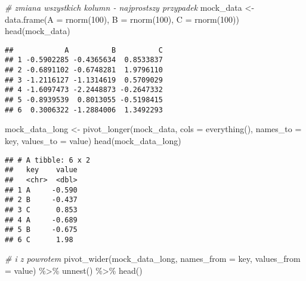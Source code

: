\documentclass[
]{book}
\newenvironment{Shaded}{\begin{snugshade}}{\end{snugshade}}
\newcommand{\AttributeTok}[1]{\textcolor[rgb]{0.77,0.63,0.00}{#1}}
\newcommand{\CommentTok}[1]{\textcolor[rgb]{0.56,0.35,0.01}{\textit{#1}}}
\newcommand{\DecValTok}[1]{\textcolor[rgb]{0.00,0.00,0.81}{#1}}
\newcommand{\FunctionTok}[1]{\textcolor[rgb]{0.00,0.00,0.00}{#1}}
\newcommand{\NormalTok}[1]{#1}
\newcommand{\OtherTok}[1]{\textcolor[rgb]{0.56,0.35,0.01}{#1}}
\newcommand{\SpecialCharTok}[1]{\textcolor[rgb]{0.00,0.00,0.00}{#1}}
\newcommand{\StringTok}[1]{\textcolor[rgb]{0.31,0.60,0.02}{#1}}
\begin{document}
\begin{Shaded}
\begin{Highlighting}[]
\CommentTok{\# zmiana wszystkich kolumn {-} najprostszy przypadek}
\NormalTok{mock\_data }\OtherTok{\textless{}{-}} \FunctionTok{data.frame}\NormalTok{(}\AttributeTok{A =} \FunctionTok{rnorm}\NormalTok{(}\DecValTok{100}\NormalTok{), }\AttributeTok{B =} \FunctionTok{rnorm}\NormalTok{(}\DecValTok{100}\NormalTok{), }\AttributeTok{C =} \FunctionTok{rnorm}\NormalTok{(}\DecValTok{100}\NormalTok{))}
\FunctionTok{head}\NormalTok{(mock\_data)}
\end{Highlighting}
\end{Shaded}

\begin{verbatim}
##            A          B          C
## 1 -0.5902285 -0.4365634  0.8533837
## 2 -0.6891102 -0.6748281  1.9796110
## 3 -1.2116127 -1.1314619  0.5709029
## 4 -1.6097473 -2.2448873 -0.2647332
## 5 -0.8939539  0.8013055 -0.5198415
## 6  0.3006322 -1.2884006  1.3492293
\end{verbatim}

\begin{Shaded}
\begin{Highlighting}[]
\NormalTok{mock\_data\_long }\OtherTok{\textless{}{-}} \FunctionTok{pivot\_longer}\NormalTok{(mock\_data, }\AttributeTok{cols =} \FunctionTok{everything}\NormalTok{(), }\AttributeTok{names\_to =} \StringTok{\textquotesingle{}key\textquotesingle{}}\NormalTok{, }\AttributeTok{values\_to =} \StringTok{\textquotesingle{}value\textquotesingle{}}\NormalTok{)}
\FunctionTok{head}\NormalTok{(mock\_data\_long)}
\end{Highlighting}
\end{Shaded}

\begin{verbatim}
## # A tibble: 6 x 2
##   key    value
##   <chr>  <dbl>
## 1 A     -0.590
## 2 B     -0.437
## 3 C      0.853
## 4 A     -0.689
## 5 B     -0.675
## 6 C      1.98
\end{verbatim}

\begin{Shaded}
\begin{Highlighting}[]
\CommentTok{\# i z powrotem}
\FunctionTok{pivot\_wider}\NormalTok{(mock\_data\_long, }\AttributeTok{names\_from =}\NormalTok{ key, }\AttributeTok{values\_from =}\NormalTok{ value) }\SpecialCharTok{\%\textgreater{}\%} \FunctionTok{unnest}\NormalTok{() }\SpecialCharTok{\%\textgreater{}\%} \FunctionTok{head}\NormalTok{()}
\end{Highlighting}
\end{Shaded}
\end{document}
